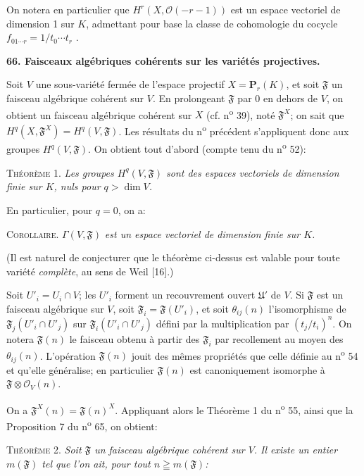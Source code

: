 On notera en particulier que $H^r(X, \mathcal{O}(-r - 1))$ est un espace vectoriel de dimension 1 sur $K$, admettant pour base la classe de cohomologie du cocycle $f_{01\cdots r} = 1/t_0 \cdots t_r$ .


\textbf{66. Faisceaux algébriques cohérents sur les variétés projectives.}

Soit $V$ une sous-variété fermée de l'espace projectif $X = \mathbf{P}_r(K)$, et soit $\mathfrak{F}$ un faisceau algébrique cohérent sur $V$. En prolongeant $\mathfrak{F}$ par 0 en dehors de $V$, on obtient un faisceau algébrique cohérent sur $X$ (cf. n\textsuperscript{o} 39), noté $\mathfrak{F}^X$; on sait que $H^q(X, \mathfrak{F}^X) = H^q(V, \mathfrak{F})$. Les résultats du n\textsuperscript{o} précédent s'appliquent donc aux groupes $H^q(V, \mathfrak{F})$. On obtient tout d'abord (compte tenu du n\textsuperscript{o} 52):

\textsc{Théorème} 1. \textit{Les groupes $H^q(V, \mathfrak{F})$ sont des espaces vectoriels de dimension finie sur $K$, nuls pour $q > \dim V$.}

En particulier, pour $q = 0$, on a:

\textsc{Corollaire}. $\Gamma(V, \mathfrak{F})$ \textit{est un espace vectoriel de dimension finie sur $K$.}

(Il est naturel de conjecturer que le théorème ci-dessus est valable pour toute variété \textit{complète}, au sens de Weil [16].)

Soit $U'_i = U_i \cap V$; les $U'_i$ forment un recouvrement ouvert $\mathfrak{U}'$ de $V$. Si $\mathfrak{F}$ est un faisceau algébrique sur $V$, soit $\mathfrak{F}_i = \mathfrak{F}(U'_i)$, et soit $\theta_{ij}(n)$ l'isomorphisme de $\mathfrak{F}_j(U'_i \cap U'_j)$ sur $\mathfrak{F}_i(U'_i \cap U'_j)$ défini par la multiplication par $(t_j/t_i)^n$. On notera $\mathfrak{F}(n)$ le faisceau obtenu à partir des $\mathfrak{F}_i$ par recollement au moyen des $\theta_{ij}(n)$. L'opération $\mathfrak{F}(n)$ jouit des mêmes propriétés que celle définie au n\textsuperscript{o} 54 et qu'elle généralise; en particulier $\mathfrak{F}(n)$ est canoniquement isomorphe à $\mathfrak{F} \otimes \mathcal{O}_V(n)$.

On a $\mathfrak{F}^X(n) = \mathfrak{F}(n)^X$. Appliquant alors le Théorème 1 du n\textsuperscript{o} 55, ainsi que la Proposition 7 du n\textsuperscript{o} 65, on obtient:

\textsc{Théorème} 2. \textit{Soit $\mathfrak{F}$ un faisceau algébrique cohérent sur $V$. Il existe un entier $m(\mathfrak{F})$ tel que l'on ait, pour tout $n \geqq m(\mathfrak{F})$:}

